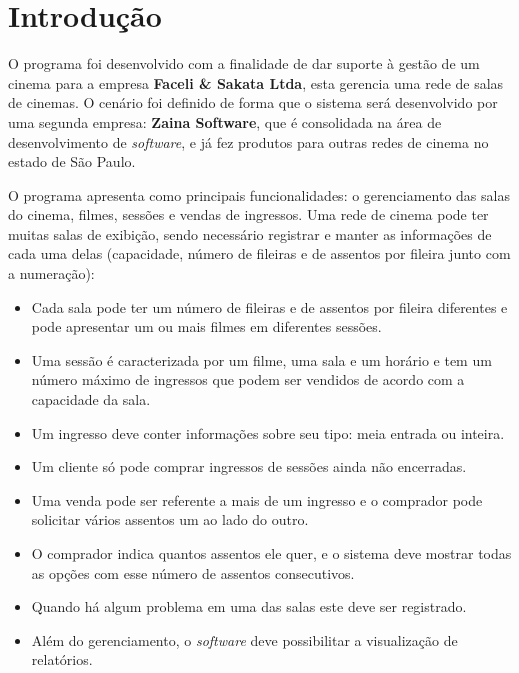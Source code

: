 \documentclass[a4paper]{article}
\begin{document}
\pagebreak


\section{Introdução}
\hspace{5 mm}O programa foi desenvolvido com a finalidade de dar suporte à gestão de um cinema para a empresa \textbf{Faceli \& Sakata Ltda}, esta gerencia uma rede de salas de cinemas. O cenário foi definido de forma que o sistema será desenvolvido por uma segunda empresa: \textbf{Zaina Software}, que é consolidada na área de desenvolvimento de \textit{software}, e já fez produtos para outras redes de cinema no estado de São Paulo.


O programa apresenta como principais funcionalidades: o gerenciamento das salas do cinema, filmes, sessões e vendas de ingressos. Uma rede de cinema pode ter muitas salas de exibição, sendo necessário registrar e manter as informações de cada uma delas (capacidade, número de fileiras e de assentos por fileira junto com a numeração):

\begin{itemize}
\item{Cada sala pode ter um número de fileiras e de assentos por fileira diferentes e pode apresentar um ou mais filmes em diferentes sessões.}

\item{Uma sessão é caracterizada por um filme, uma sala e um horário e tem um número máximo de ingressos que podem ser vendidos de acordo com a capacidade da sala.}

\item{Um ingresso deve conter informações sobre seu tipo: meia entrada ou inteira.}

\item{Um cliente só pode comprar ingressos de sessões ainda não encerradas.}

\item{Uma venda pode ser referente a mais de um ingresso e o comprador pode solicitar vários assentos um ao lado do outro.}

\item{O comprador indica quantos assentos ele quer, e o sistema deve mostrar todas as opções com esse número de assentos consecutivos.}

\item{Quando há algum problema em uma das salas este deve ser registrado.}

\item{Além do gerenciamento, o \textit{software} deve possibilitar a visualização de relatórios.}

\end{itemize}
\end{document}
